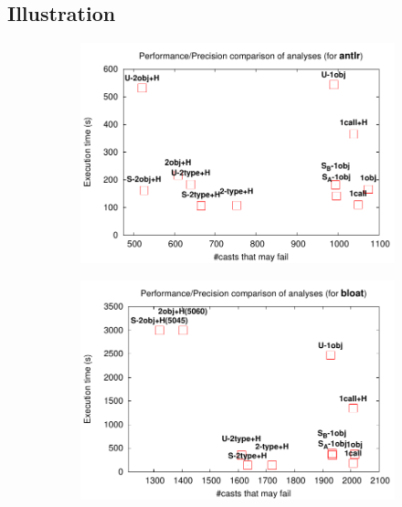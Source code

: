 
\subsection{Illustration}

\begin{figure}[tbp]
\vspace{-0.5cm}
\hspace{-1cm}
\begin{center}
\begin{subfigure}[b]{0.45\textwidth}
\includegraphics[width=\textwidth]{assets/hybrid/antlr.pdf}
\end{subfigure}\hspace{1cm}%
\begin{subfigure}[b]{0.45\textwidth}
\includegraphics[width=\textwidth]{assets/hybrid/bloat.pdf}

\end{subfigure}
\end{center}
\end{figure}
